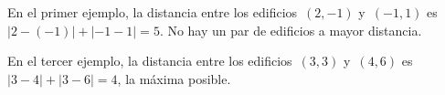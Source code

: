 \begin{example}
\end{example}

\explanationText

En el primer ejemplo, la distancia entre los edificios~$(2, -1)$ y~$(-1, 1)$
es~$|2 - (- 1)| + |-1 - 1| = 5$. No hay un par de edificios a mayor distancia.

En el tercer ejemplo, la distancia entre los edificios~$(3, 3)$ y~$(4, 6)$
es~$|3 - 4| + |3 - 6| = 4$, la máxima posible.
